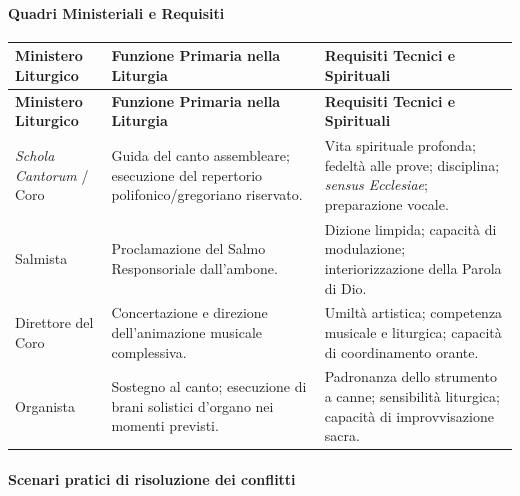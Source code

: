 \documentclass[12pt,a4paper]{article}
\begin{document}
	\paragraph{Quadri Ministeriali e Requisiti}\label{quadri-ministeriali-e-requisiti}
	
	\begin{longtable}{L{3cm}L{5cm}L{5cm}}
		\toprule
		\textbf{Ministero Liturgico} & \textbf{Funzione Primaria nella Liturgia} & \textbf{Requisiti Tecnici e Spirituali} \\
		\midrule
		\endfirsthead
		\toprule
		\textbf{Ministero Liturgico} & \textbf{Funzione Primaria nella Liturgia} & \textbf{Requisiti Tecnici e Spirituali} \\
		\midrule
		\endhead
		\bottomrule
		\endlastfoot
		\emph{Schola Cantorum} / Coro & Guida del canto assembleare; esecuzione del repertorio polifonico/gregoriano riservato. & Vita spirituale profonda; fedeltà alle prove; disciplina; \emph{sensus Ecclesiae}; preparazione vocale. \\
		Salmista & Proclamazione del Salmo Responsoriale dall'ambone. & Dizione limpida; capacità di modulazione; interiorizzazione della Parola di Dio. \\
		Direttore del Coro & Concertazione e direzione dell'animazione musicale complessiva. & Umiltà artistica; competenza musicale e liturgica; capacità di coordinamento orante. \\
		Organista & Sostegno al canto; esecuzione di brani solistici d'organo nei momenti previsti. & Padronanza dello strumento a canne; sensibilità liturgica; capacità di improvvisazione sacra. \\
	\end{longtable}
	
	\paragraph{Scenari pratici di risoluzione dei conflitti}\label{scenari-pratici-di-risoluzione-dei-conflitti}
	
\end{document}
